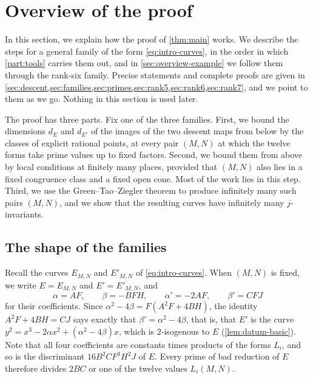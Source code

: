 \chapter{Overview of the proof}\label{sec:overview}

In this section, we explain how the proof of \cref{thm:main} works. We describe the steps for a general family of the form \eqref{eq:intro-curves}, in the order in which \cref{part:tools} carries them out, and in \cref{sec:overview-example} we follow them through the rank-six family. Precise statements and complete proofs are given in \cref{sec:descent,sec:families,sec:primes,sec:rank5,sec:rank6,sec:rank7}, and we point to them as we go. Nothing in this section is used later.

The proof has three parts. Fix one of the three families. First, we bound the dimensions $d_E$ and $d_{E'}$ of the images of the two descent maps from below by the classes of explicit rational points, at every pair $(M,N)$ at which the twelve forms take prime values up to fixed factors. Second, we bound them from above by local conditions at finitely many places, provided that $(M,N)$ also lies in a fixed congruence class and a fixed open cone. Most of the work lies in this step. Third, we use the Green--Tao--Ziegler theorem to produce infinitely many such pairs $(M,N)$, and we show that the resulting curves have infinitely many $j$-invariants.

\section{The shape of the families}\label{sec:overview-shape}

Recall the curves $E_{M,N}$ and $E'_{M,N}$ of \eqref{eq:intro-curves}. When $(M,N)$ is fixed, we write $E=E_{M,N}$ and $E'=E'_{M,N}$, and
\begin{equation*}
\alpha=AF,\qquad\beta=-BFH,\qquad\alpha'=-2AF,\qquad\beta'=CFJ
\end{equation*}
for their coefficients. Since $\alpha^2-4\beta=F(A^2F+4BH)$, the identity $A^2F+4BH=CJ$ says exactly that $\beta'=\alpha^2-4\beta$, that is, that $E'$ is the curve $y^2=x^3-2\alpha x^2+(\alpha^2-4\beta)x$, which is $2$-isogenous to $E$ (\cref{lem:datum-basic}). Note that all four coefficients are constants times products of the forms $L_i$, and so is the discriminant $16B^2CF^3H^2J$ of $E$. Every prime of bad reduction of $E$ therefore divides $2BC$ or one of the twelve values $L_i(M,N)$.

